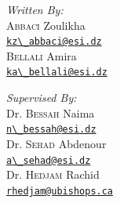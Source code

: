{\begin{titlepage}
    \vspace{4mm}

    \noindent
    \begin{minipage}{0.6\textwidth}
      \vspace{-5mm}
      \begin{flushleft} \large
        \emph{Written By:}\\
        \textsc{Abbaci} Zoulikha \\
        \href{mailto:kz_abbaci@esi.dz}{\verb!kz\_abbaci@esi.dz!} \\[0.3cm]
        \textsc{Bellali} Amira \\
        \href{mailto:ka_bellali@esi.dz}{\verb!ka\_bellali@esi.dz!}
      \end{flushleft}
    \end{minipage}
    \begin{minipage}{0.35\textwidth}
      \begin{flushright} \large
        \begin{flushleft} \large
          \emph{Supervised By:} \\
          Dr. \textsc{Bessah} Naima\\
          \href{mailto:n_bessah@esi.dz}{\verb!n\_bessah@esi.dz!}\\[0.3cm]
          Dr. \textsc{Sehad} Abdenour\\
          \href{mailto:a_sehad@esi.dz}{\verb!a\_sehad@esi.dz!}\\
          Dr. \textsc{Hedjam} Rachid\\
          \href{mailto:a_sehad@esi.dz}{\verb!rhedjam@ubishops.ca!}
        \end{flushleft}
      \end{flushright}
    \end{minipage}\\[1cm]







\end{titlepage}}

